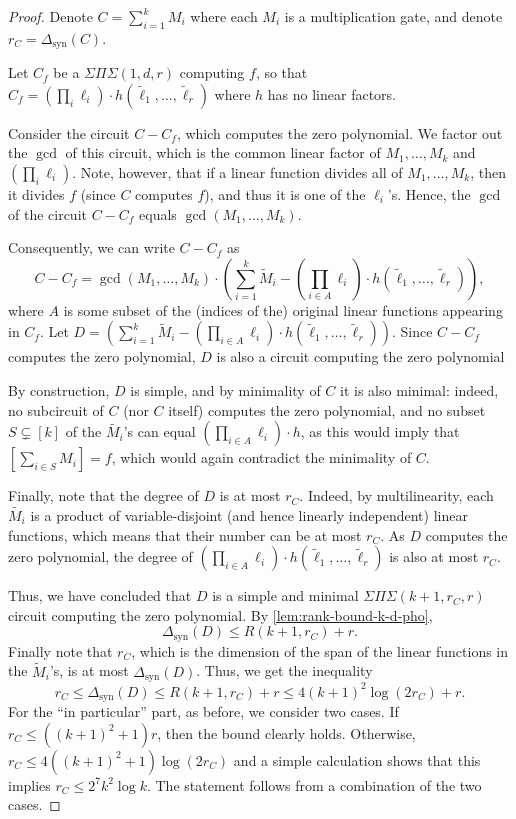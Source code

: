 \documentclass[12pt]{article}
\newcommand{\SumProdSum}{\Sigma \Pi \Sigma}
\newcommand{\ranksyn}{\Delta_{\text{syn}}}
\begin{document}
	\begin{proof}
		Denote $C = \sum_{i=1}^k M_i$ where each $M_i$ is a multiplication gate, and denote $r_C = \ranksyn(C)$.
		
		Let $C_f$ be a $\SumProdSum(1,d,r)$ computing $f$, so that $C_f = (\prod_i \ell_i) \cdot h(\tilde{\ell}_1, \ldots, \tilde{\ell}_r)$ where $h$ has no linear factors.
		
		Consider the circuit $C - C_f$, which computes the zero polynomial. We factor out the $\gcd$ of this circuit, which is the common linear factor of $M_1, \ldots, M_k$ and $ (\prod_i \ell_i) $. Note, however, that if a linear function divides all of $M_1, \ldots, M_k$, then it divides $f$ (since $C$ computes $f$), and thus it is one of the $\ell_i$'s. Hence, the $\gcd$ of the circuit $C-C_f$ equals $\gcd(M_1, \ldots, M_k)$.
		
		Consequently, we can write $C-C_f$ as
		\[
		C-C_f = \gcd(M_1, \ldots, M_k) \cdot \left( \sum_{i=1}^k \tilde{M}_i - \left( \prod_{i \in A} \ell_i \right) \cdot h(\tilde{\ell}_1, \ldots, \tilde{\ell}_r) \right),
		\]
		where $A$ is some subset of the (indices of the) original linear functions appearing in $C_f$.
		Let $D=\left( \sum_{i=1}^k \tilde{M}_i - \left( \prod_{i \in A} \ell_i \right) \cdot h(\tilde{\ell}_1, \ldots, \tilde{\ell}_r) \right)$. Since $C-C_f$ computes the zero polynomial, $D$ is also a circuit computing the zero polynomial
		
		By construction, $D$ is simple, and by minimality of $C$ it is also minimal: indeed, no subcircuit of $C$ (nor $C$ itself) computes the zero polynomial, and no subset $S \subsetneq [k]$ of the $\tilde{M_i}$'s can equal $\left( \prod_{i \in A} \ell_i \right) \cdot h$, as this would imply that $[\sum_{i \in S} M_i]=f$, which would again contradict the minimality of $C$.
		
		Finally, note that the degree of $D$ is at most $r_C$. Indeed, by multilinearity, each $\tilde{M_i}$ is a product of variable-disjoint (and hence linearly independent) linear functions, which means that their number can be at most $r_C$. As $D$ computes the zero polynomial, the degree of $ \left( \prod_{i \in A} \ell_i \right) \cdot h(\tilde{\ell}_1, \ldots, \tilde{\ell}_r)$ is also at most $r_C$.
		
		Thus, we have concluded that $D$ is a simple and minimal $\SumProdSum(k+1, r_C, r)$ circuit computing the zero polynomial. By \autoref{lem:rank-bound-k-d-pho},
		\[
		\ranksyn(D) \le R(k+1, r_C) + r.
		\]
		Finally note that $r_C$, which is the dimension of the span of the linear functions in the $\tilde{M}_i$'s, is at most $\ranksyn(D)$. Thus, we get the inequality
		\[
		r_C\le\ranksyn(D) \le R(k+1, r_C) + r \le  4 (k+1)^2 \log (2r_C)+r.
		\]
		For the ``in particular'' part, as before, we consider two cases. If $r_C  \le ((k+1)^2+1)r$,  then the bound clearly holds. Otherwise,
		$r_C \le 4 ((k+1)^2+1) \log (2r_C)$ and a simple calculation shows that this implies  $r_C \le 2^7 k^2 \log k$. The statement follows from a combination of the two cases.
	\end{proof}
	
\end{document}
